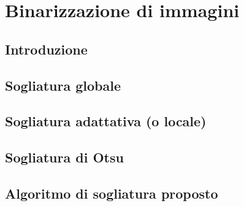 \chapter{Binarizzazione di immagini}
\label{image-binarization}

\section{Introduzione}
\section{Sogliatura globale}
\section{Sogliatura adattativa (o locale)}
\section{Sogliatura di Otsu}
\section{Algoritmo di sogliatura proposto}

